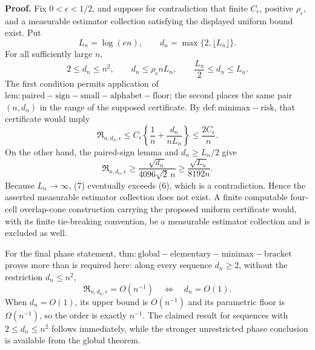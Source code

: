 \textbf{Proof.}
Fix \(0<\epsilon<1/2\), and suppose for contradiction that finite \(C_\epsilon\), positive \(\rho_\epsilon\), and a measurable estimator collection satisfying the displayed uniform bound exist.  Put
\[
 L_n=\log(en),
 \qquad
 d_n=\max\{2,\lfloor L_n\rfloor\}.
\]
For all sufficiently large \(n\),
\[
 2\leq d_n\leq n^2,
 \qquad
 d_n\leq\rho_\epsilon nL_n,
 \qquad
 \frac{L_n}{2}\leq d_n\leq L_n.
\]
The first condition permits application of \(\mathrm{lem:paired-sign-small-alphabet-floor}\); the second places the same pair \((n,d_n)\) in the range of the supposed certificate.  By \(\mathrm{def:minimax-risk}\), that certificate would imply
\[
 \mathfrak R_{n,d_n,\epsilon}
 \leq C_\epsilon\left\{
   \frac1n+\frac{d_n}{nL_n}
 \right\}
 \leq\frac{2C_\epsilon}{n}.
 \tag{6}
\]
On the other hand, the paired-sign lemma and \(d_n\geq L_n/2\) give
\[
 \mathfrak R_{n,d_n,\epsilon}
 \geq\frac{\sqrt{d_n}}{4096\sqrt2\,n}
 \geq\frac{\sqrt{L_n}}{8192n}.
 \tag{7}
\]
Because \(L_n\to\infty\), (7) eventually exceeds (6), which is a contradiction.  Hence the asserted measurable estimator collection does not exist.  A finite computable four-cell overlap-cone construction carrying the proposed uniform certificate would, with its finite tie-breaking convention, be a measurable estimator collection and is excluded as well.

For the final phase statement, \(\mathrm{thm:global-elementary-minimax-bracket}\) proves more than is required here: along every sequence \(d_n\geq2\), without the restriction \(d_n\leq n^2\),
\[
 \mathfrak R_{n,d_n,\epsilon}=O(n^{-1})
 \quad\Longleftrightarrow\quad
 d_n=O(1).
\]
When \(d_n=O(1)\), its upper bound is \(O(n^{-1})\) and its parametric floor is \(\Omega(n^{-1})\), so the order is exactly \(n^{-1}\).  The claimed result for sequences with \(2\leq d_n\leq n^2\) follows immediately, while the stronger unrestricted phase conclusion is available from the global theorem.